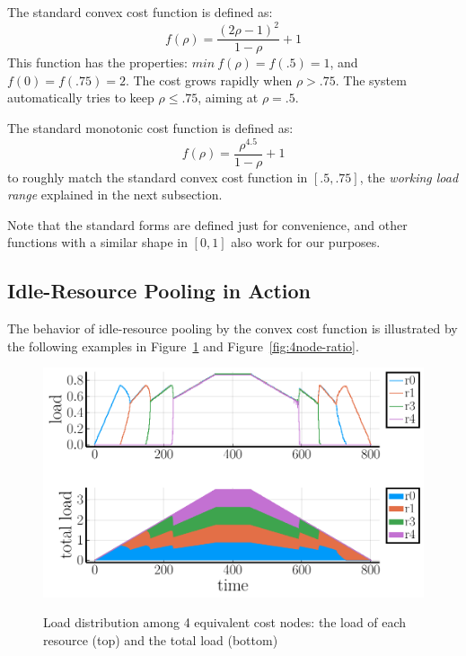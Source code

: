 The standard convex cost function is defined as:
\begin{equation*}
	f(\rho) = \frac{(2\rho - 1)^{2}}{1 - \rho} + 1
\end{equation*}
This function has the properties:
$min\: f(\rho) = f(.5) = 1$, and $f(0) = f(.75) = 2$.
The cost grows rapidly when $\rho > .75$.
The system automatically tries to keep $\rho \le .75$,
aiming at $\rho = .5$.

The standard monotonic cost function is defined as:
\begin{equation*}
	f(\rho) = \frac{\rho^{4.5}}{1 - \rho} + 1
\end{equation*}
to roughly match the standard convex cost function in $[.5, .75]$,
the {\em working load range} explained in the next subsection.

Note that the standard forms are defined just for convenience, and
other functions with a similar shape in $[0,1]$ also work for our
purposes.

\subsection{Idle-Resource Pooling in Action}

The behavior of idle-resource pooling by the convex cost function is
illustrated by the following examples in Figure~\ref{fig:4node} and
Figure~\ref{fig:4node-ratio}.

\begin{figure}[tb]
  \begin{center}
    \includegraphics[width=1.0\columnwidth]{equivalent_nodes.pdf}
    \vspace{-2.0ex}
    \caption{Load distribution among 4 equivalent cost nodes:
    the load of each resource (top) and the total load (bottom)}
    \label{fig:4node}
  \end{center}
  \hspace{0.8\columnsep}
\end{figure}

